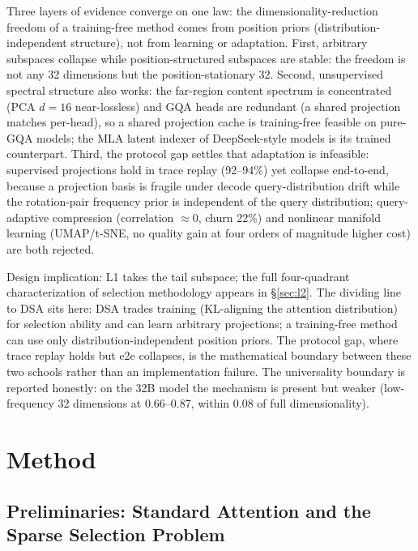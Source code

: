 \documentclass[11pt]{article}
\begin{document}
Three layers of evidence converge on one law: the dimensionality-reduction freedom of a training-free method comes from position priors (distribution-independent structure), not from learning or adaptation. First, arbitrary subspaces collapse while position-structured subspaces are stable: the freedom is not any 32 dimensions but the position-stationary 32. Second, unsupervised spectral structure also works: the far-region content spectrum is concentrated (PCA $d{=}16$ near-lossless) and GQA heads are redundant (a shared projection matches per-head), so a shared projection cache is training-free feasible on pure-GQA models; the MLA latent indexer of DeepSeek-style models is its trained counterpart. Third, the protocol gap settles that adaptation is infeasible: supervised projections hold in trace replay (92--94\%) yet collapse end-to-end, because a projection basis is fragile under decode query-distribution drift while the rotation-pair frequency prior is independent of the query distribution; query-adaptive compression (correlation $\approx 0$, churn 22\%) and nonlinear manifold learning (UMAP/t-SNE, no quality gain at four orders of magnitude higher cost) are both rejected.

Design implication: L1 takes the tail subspace; the full four-quadrant characterization of selection methodology appears in \S\ref{sec:l2}. The dividing line to DSA sits here: DSA trades training (KL-aligning the attention distribution) for selection ability and can learn arbitrary projections; a training-free method can use only distribution-independent position priors. The protocol gap, where trace replay holds but e2e collapses, is the mathematical boundary between these two schools rather than an implementation failure. The universality boundary is reported honestly: on the 32B model the mechanism is present but weaker (low-frequency 32 dimensions at 0.66--0.87, within 0.08 of full dimensionality).

\section{Method}

\subsection{Preliminaries: Standard Attention and the Sparse Selection Problem}
\end{document}
